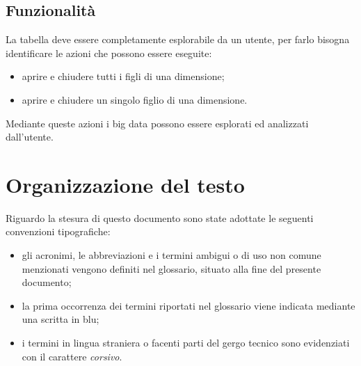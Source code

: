 \subsection{Funzionalità}
La tabella deve essere completamente esplorabile da un utente, per farlo bisogna identificare le azioni che possono essere eseguite:
\begin{itemize}
	\item aprire e chiudere tutti i figli di una dimensione;
	\item aprire e chiudere un singolo figlio di una dimensione.
\end{itemize}
Mediante queste azioni i big data possono essere esplorati ed analizzati dall'utente.

\section{Organizzazione del testo}
Riguardo la stesura di questo documento sono state adottate le seguenti convenzioni tipografiche:
\begin{itemize}
	\item gli acronimi, le abbreviazioni e i termini ambigui o di uso non comune menzionati vengono definiti nel glossario, situato alla fine del presente documento;
	\item la prima occorrenza dei termini riportati nel glossario viene indicata mediante una scritta in blu;
	\item i termini in lingua straniera o facenti parti del gergo tecnico sono evidenziati con il carattere \emph{corsivo}.
\end{itemize}